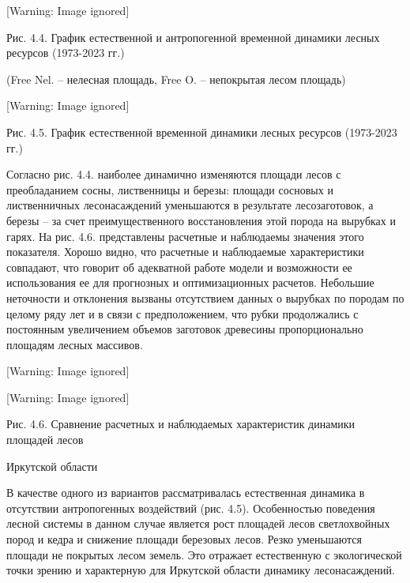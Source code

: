 \documentclass{report}
\begin{document}
  [Warning: Image ignored] %
 

Рис. 4.4. График естественной и антропогенной временной динамики лесных ресурсов (1973-2023 гг.)

(Free Nel. – нелесная площадь, Free O. – непокрытая лесом площадь)

  [Warning: Image ignored] %
 

Рис. 4.5. График естественной временной динамики лесных ресурсов (1973-2023 гг.)

Согласно рис. 4.4. наиболее динамично изменяются площади лесов с преобладанием сосны, лиственницы и березы: площади
сосновых и лиственничных лесонасаждений уменьшаются в результате лесозаготовок, а березы – за счет преимущественного
восстановления этой порода на вырубках и гарях. На рис. 4.6. представлены расчетные и наблюдаемы значения этого
показателя. Хорошо видно, что расчетные и наблюдаемые характеристики совпадают, что говорит об адекватной работе модели
и возможности ее использования ее для прогнозных и оптимизационных расчетов. Небольшие неточности и отклонения вызваны
отсутствием данных о вырубках по породам по целому ряду лет и в связи с предположением, что рубки продолжались с
постоянным увеличением объемов заготовок древесины пропорционально площадям лесных массивов.

  [Warning: Image ignored] %
 

\begin{center}
 [Warning: Image ignored] %

\end{center}
Рис. 4.6. Сравнение расчетных и наблюдаемых характеристик динамики площадей лесов 

Иркутской области

В качестве одного из вариантов рассматривалась естественная динамика в отсутствии антропогенных воздействий (рис. 4.5).
Особенностью поведения лесной системы в данном случае является рост площадей лесов светлохвойных пород и кедра  и
снижение площади березовых лесов. Резко уменьшаются площади не покрытых лесом земель. Это отражает естественную с
экологической точки зрению и характерную для Иркутской области динамику лесонасаждений. 
\end{document}
